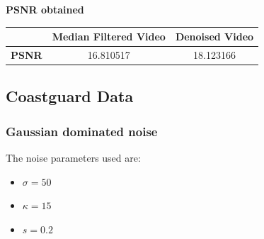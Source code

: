 \documentclass{article}
\begin{document}
\textbf{PSNR obtained}
\begin{table}[H]
    \begin{tabular}{|c|c|c|}
    \hline
    \textbf{}     & Median Filtered Video & Denoised Video   \\
    \hline
    \textbf{PSNR} & 16.810517             & 18.123166       \\
    \hline
    \end{tabular}
    \end{table}

\newpage
\subsection{Coastguard Data}
\subsubsection*{Gaussian dominated noise}
The noise parameters used are: \\
\begin{itemize}
    \item $\sigma = 50$
    \item $\kappa = 15$
    \item $s = 0.2$
\end{itemize}
\end{document}
